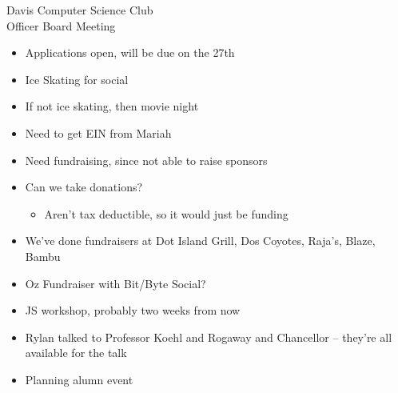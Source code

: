 \documentclass{article}
\begin{document}
\begin{Minutes}{Davis Computer Science Club\\Officer Board Meeting}




\maketitle

\begin {itemize}
    \item Applications open, will be due on the 27th 
    \item Ice Skating for social
    \item If not ice skating, then movie night
\end {itemize}

\begin{itemize}
    \item Need to get EIN from Mariah
    \item Need fundraising, since not able to raise sponsors
    \item Can we take donations?
    \begin{itemize}
        \item Aren't tax deductible, so it would just be funding
    \end{itemize}
    \item We've done fundraisers at Dot Island Grill, Dos Coyotes, Raja's, Blaze, Bambu 
    \item Oz Fundraiser with Bit/Byte Social?
\end{itemize}


\begin {itemize}
    \item JS workshop, probably two weeks from now
\end {itemize}

\begin {itemize}
    \item Rylan talked to Professor Koehl and Rogaway and Chancellor -- they're all available for the talk
    \item Planning alumn event
\end {itemize}


\end{Minutes}
\end{document}

